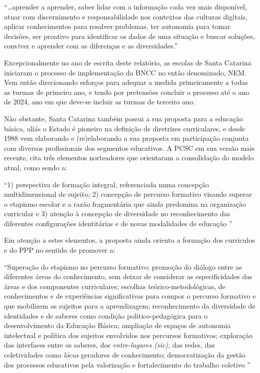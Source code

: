 \begin{citacao}
    ``\ldots aprender a aprender, saber lidar com a informação cada vez mais disponível, atuar com discernimento e responsabilidade nos contextos das culturas digitais, aplicar conhecimentos para resolver problemas, ter autonomia para tomar decisões, ser proativo para identificar os dados de uma situação e buscar soluções, conviver e aprender com as diferenças e as diversidades.'' 
\end{citacao}
Excepcionalmente no ano de escrita deste relatório, as escolas de Santa Catarina iniciaram o processo de implementação da \ac{BNCC} no então denominado, \ac{NEM}. Vem então direcionando esforços para adequar a medida primeiramente a todas as turmas de primeiro ano, e tendo por pretensões concluir o processo até o ano de 2024, ano em que deve-se incluir as turmas de terceiro ano.

Não obstante, Santa Catarina também possui a sua proposta para a educação básica, aliás o Estado é pioneiro na definição de diretrizes curriculares, e desde 1988 vem elaborando e (re)elaborando a sua proposta em participação conjunta com diversos profissionais dos segmentos educativos. A \ac{PCSC} em sua versão mais recente, cita três elementos norteadores que orientaram a consolidação do modelo atual, como sendo a:

\begin{citacao}
    ``1) perspectiva de formação integral, referenciada numa concepção multidimensional de sujeito; 2) concepção de percurso formativo visando superar o etapismo escolar e a razão fragmentária que ainda predomina na organização curricular e 3) atenção à concepção de diversidade no reconhecimento das diferentes configurações identitárias e de novas modalidades de educação \cite[p.~20]{PCSC:2014}''
\end{citacao}
Em atenção a estes elementos, a proposta ainda orienta a formação dos curriculos e do \ac{PPP} no sentido de promover a:

\begin{citacao}
    ``Superação do etapismo no percurso formativo; promoção do diálogo entre as diferentes áreas do conhecimento, sem deixar de considerar as especificidades das áreas e dos componentes curriculares; escolhas teórico-metodológicas, de conhecimentos e de experiências significativas para compor o percurso formativo e que mobilizem os sujeitos para a aprendizagem; reconhecimento da diversidade de identidades e de saberes como condição político-pedagógica para o desenvolvimento da Educação Básica; ampliação de espaços de autonomia intelectual e política dos sujeitos envolvidos nos percursos formativos; exploração das interfaces entre os saberes, dos \emph{entre-lugares (sic)}, das redes, das coletividades como \emph{lócus} geradores de conhecimento; democratização da gestão dos processos educativos pela valorização e fortalecimento do trabalho coletivo ''
\end{citacao}

